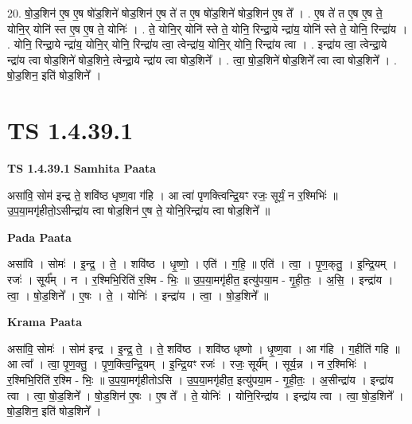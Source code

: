 \documentclass[17pt]{extarticle}
\begin{document}
20. षो॒ड॒शिन॑ ए॒ष ए॒ष षो॑ड॒शिने॑ षोड॒शिन॑ ए॒ष ते॑ त ए॒ष षो॑ड॒शिने॑ षोड॒शिन॑ ए॒ष ते᳚ । . ए॒ष ते॑ त ए॒ष ए॒ष ते॒ योनि॒र् योनि॑ स्त ए॒ष ए॒ष ते॒ योनिः॑ । . ते॒ योनि॒र् योनि॑ स्ते ते॒ योनि॒ रिन्द्रा॒ये न्द्रा॑य॒ योनि॑ स्ते ते॒ योनि॒ रिन्द्रा॑य । . योनि॒ रिन्द्रा॒ये न्द्रा॑य॒ योनि॒र् योनि॒ रिन्द्रा॑य त्वा॒ त्वेन्द्रा॑य॒ योनि॒र् योनि॒ रिन्द्रा॑य त्वा । . इन्द्रा॑य त्वा॒ त्वेन्द्रा॒ये न्द्रा॑य त्वा षोड॒शिने॑ षोड॒शिने॒ त्वेन्द्रा॒ये न्द्रा॑य त्वा षोड॒शिने᳚ । . त्वा॒ षो॒ड॒शिने॑ षोड॒शिने᳚ त्वा त्वा षोड॒शिने᳚ । . षो॒ड॒शिन॒ इति॑ षोड॒शिने᳚ । \newline
\pagebreak
{}

\section{ TS 1.4.39.1 }

\textbf{TS 1.4.39.1 } \newline
\textbf{Samhita Paata} \newline

असा॑वि॒ सोम॑ इन्द्र ते॒ शवि॑ष्ठ धृष्ण॒वा ग॑हि । आ त्वा॑ पृणक्त्विन्द्रि॒यꣳ रजः॒ सूर्यं॒ न र॒श्मिभिः॑ ॥ उ॒प॒या॒मगृ॑हीतो॒ऽसीन्द्रा॑य त्वा षोड॒शिन॑ ए॒ष ते॒ योनि॒रिन्द्रा॑य त्वा षोड॒शिने᳚ ॥ \newline

\textbf{Pada Paata} \newline

असा॑वि । सोमः॑ । इ॒न्द्र॒ । ते॒ । शवि॑ष्ठ । धृ॒ष्णो॒ । एति॑ । ग॒हि॒ ॥ एति॑ । त्वा॒ । पृ॒ण॒क्‌तु॒ । इ॒न्द्रि॒यम् । रजः॑ । सूर्य᳚म् । न । र॒श्मिभि॒रिति॑ र॒श्मि - भिः॒ ॥ उ॒प॒या॒मगृ॑हीत॒ इत्यु॑पया॒म - गृ॒ही॒तः॒ । अ॒सि॒ । इन्द्रा॑य । त्वा॒ । षो॒ड॒शिने᳚ । ए॒षः । ते॒ । योनिः॑ । इन्द्रा॑य । त्वा॒ । षो॒ड॒शिने᳚ ॥  \newline


\textbf{Krama Paata} \newline

असा॑वि॒ सोमः॑ । सोम॑ इन्द्र । इ॒न्द्र॒ ते॒ । ते॒ शवि॑ष्ठ । शवि॑ष्ठ धृष्णो । धृ॒ष्ण॒वा । आ ग॑हि । ग॒हीति॑ गहि ॥ आ त्वा᳚ । त्वा॒ पृ॒ण॒क्तु॒ । पृ॒ण॒क्त्वि॒न्द्रि॒यम् । इ॒न्द्रि॒यꣳ रजः॑ । रजः॒ सूर्य᳚म् । सूर्य॒न्न । न र॒श्मिभिः॑ । र॒श्मिभि॒रिति॑ र॒श्मि - भिः॒ ॥ उ॒प॒या॒मगृ॑हीतोऽसि । उ॒प॒या॒मगृ॑हीत॒ इत्यु॑पया॒म - गृ॒ही॒तः॒ । अ॒सीन्द्रा॑य । इन्द्रा॑य त्वा । त्वा॒ षो॒ड॒शिने᳚ । षो॒ड॒शिन॑ ए॒षः । ए॒ष ते᳚ । ते॒ योनिः॑ । योनि॒रिन्द्रा॑य । इन्द्रा॑य त्वा । त्वा॒ षो॒ड॒शिने᳚ । षो॒ड॒शिन॒ इति॑ षोड॒शिने᳚ । \newline
\end{document}
